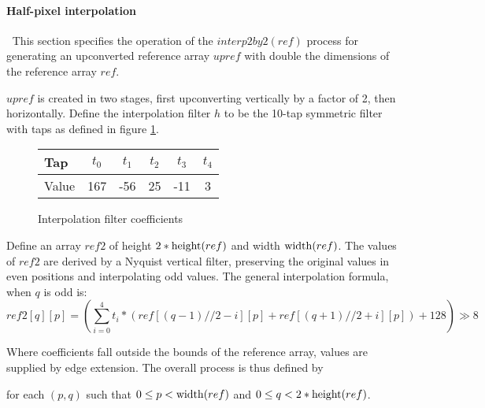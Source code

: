 \paragraph{Half-pixel interpolation}
\label{halfpel}
$\ $\newline
This section specifies the operation of the $interp2by2(ref)$ process for generating
an upconverted reference array $upref$ with double the dimensions of the reference
array $ref$. 

$upref$ is created in two stages, first upconverting vertically by
a factor of 2, then horizontally. Define the interpolation filter $h$
to be the 10-tap symmetric filter with taps as defined in figure \ref{upfilter}.

\begin{figure}[h!]
\begin{centering}
\begin{tabular}{l|ccccc}
Tap & $t_0$ & $t_1$ & $t_2$ & $t_3$ & $t_4$\\
\hline
Value & 167 & -56 & 25 & -11 & 3
\end{tabular}
\caption{Interpolation filter coefficients \label{upfilter}}
\end{centering}
\end{figure}

Define an array $ref2$ of height $2*\operatorname{height}(ref)$ and width $\operatorname{width}(ref)$.
The values of $ref2$ are derived by a Nyquist vertical filter, preserving
the original values in even positions and interpolating odd values. The general 
interpolation formula, when $q$ is odd is:
\[
ref2[q][p]=  \left(\sum_{i=0}^{4} t_i *
\left(
 ref[(q-1)//2-i][p]
+ref[(q+1)//2+i][p]
\right)+128 \right)\gg 8
\]

Where coefficients fall outside the bounds of the reference array, values
are supplied by edge extension. The overall process is thus defined by

\begin{pseudo*}
\bsELSE
{}
\bsEND
{}
\end{pseudo*}

for each $(p,q)$ such that $0\leq p<\operatorname{width}(ref)$ and $0\leq q<2*\operatorname{height}(ref)$.

